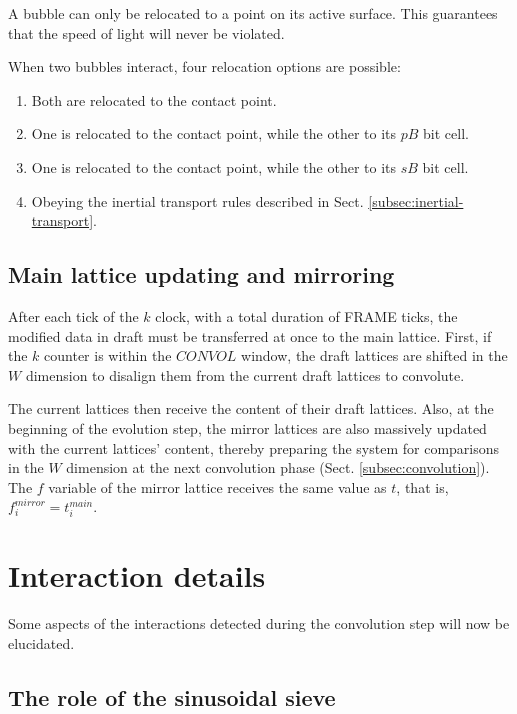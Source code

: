 \documentclass[12pt,english]{article}
\begin{document}
A bubble can only be relocated to a point on its active surface. This guarantees that the speed of light will never be violated. 

When two bubbles interact, four relocation options are possible:

\begin{enumerate}
\item Both are relocated to the contact point.
    \item One is relocated to the contact point, while the other to its $pB$ bit cell.
    \item One is relocated to the contact point, while the other to its $sB$ bit cell.
    \item Obeying the inertial transport rules described in Sect. \ref{subsec:inertial-transport}.
\end{enumerate}

\subsection{Main lattice updating and mirroring} \label{subsec:updating}
After each tick of the $k$ clock, with a total duration of FRAME ticks, the modified data in draft must be transferred at once to the main lattice. First, if the $k$ counter is within the $CONVOL$ window, the draft lattices are shifted in the $W$ dimension to disalign them from the current draft lattices to convolute.

The current lattices then receive the content of their draft lattices. Also, at the beginning of the evolution step, the mirror lattices are also massively updated with the current lattices' content, thereby preparing the system for comparisons in the $W$ dimension at the next convolution phase (Sect. \ref{subsec:convolution}). The $f$ variable of the mirror lattice receives the same value as $t$, that is, $f_i^{mirror}=t_i^{main}$.


\section{Interaction details\label{sec:Interactions}}

Some aspects of the interactions detected during the convolution step will now be elucidated.

\subsection{The role of the sinusoidal sieve}
\end{document}
